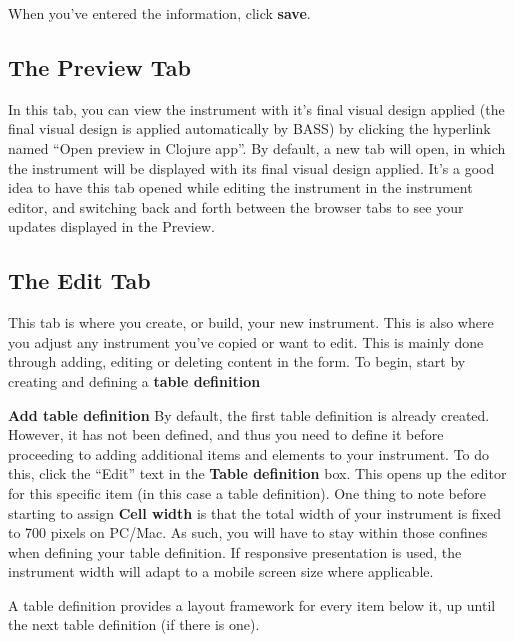 \documentclass[]{book}
\begin{document}
When you've entered the information, click \textbf{save}.

\hypertarget{the-preview-tab}{%
\subsection{The Preview Tab}\label{the-preview-tab}}

In this tab, you can view the instrument with it's final visual design applied (the final visual design is applied automatically by BASS) by clicking the hyperlink named ``Open preview in Clojure app''.
By default, a new tab will open, in which the instrument will be displayed with its final visual design applied. It's a good idea to have this tab opened while editing the instrument in the instrument editor, and switching back and forth between the browser tabs to see your updates displayed in the Preview.

\hypertarget{the-edit-tab}{%
\subsection{The Edit Tab}\label{the-edit-tab}}

This tab is where you create, or build, your new instrument. This is also where you adjust any instrument you've copied or want to edit. This is mainly done through adding, editing or deleting content in the form.
To begin, start by creating and defining a \textbf{table definition}

\textbf{Add table definition}
By default, the first table definition is already created. However, it has not been defined, and thus you need to define it before proceeding to adding additional items and elements to your instrument. To do this, click the ``Edit'' text in the \textbf{Table definition} box. This opens up the editor for this specific item (in this case a table definition).
One thing to note before starting to assign \textbf{Cell width} is that the total width of your instrument is fixed to 700 pixels on PC/Mac. As such, you will have to stay within those confines when defining your table definition.
If responsive presentation is used, the instrument width will adapt to a mobile screen size where applicable.

A table definition provides a layout framework for every item below it, up until the next table definition (if there is one).
\end{document}
